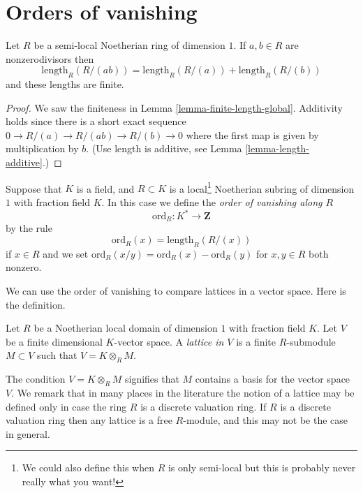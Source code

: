\section{Orders of vanishing}
\label{section-orders-of-vanishing}

\begin{lemma}
\label{lemma-ord-additive}
Let $R$ be a semi-local Noetherian ring of dimension $1$.
If $a, b \in R$ are nonzerodivisors then
$$
\text{length}_R(R/(ab)) =
\text{length}_R(R/(a)) +
\text{length}_R(R/(b))
$$
and these lengths are finite.
\end{lemma}

\begin{proof}
We saw the finiteness in Lemma \ref{lemma-finite-length-global}.
Additivity holds since there is a short exact sequence
$0 \to R/(a) \to R/(ab) \to R/(b) \to 0$ where the first map
is given by multiplication by $b$. (Use length is additive,
see Lemma \ref{lemma-length-additive}.)
\end{proof}

\begin{definition}
\label{definition-ord}
Suppose that $K$ is a field, and $R \subset K$ is a
local\footnote{We could also define this when $R$ is only
semi-local but this is probably never really what you want!}
Noetherian subring of dimension $1$ with fraction field $K$.
In this case we define the {\it order of vanishing along $R$}
$$
\text{ord}_R : K^* \longrightarrow \mathbf{Z}
$$
by the rule
$$
\text{ord}_R(x) = \text{length}_R(R/(x))
$$
if $x \in R$ and we set
$\text{ord}_R(x/y) = \text{ord}_R(x) - \text{ord}_R(y)$
for $x, y \in R$ both nonzero.
\end{definition}

\noindent
We can use the order of vanishing to compare lattices in a
vector space. Here is the definition.

\begin{definition}
\label{definition-lattice}
Let $R$ be a Noetherian local domain of dimension $1$ with
fraction field $K$. Let $V$ be a finite dimensional $K$-vector space.
A {\it lattice in $V$} is a finite $R$-submodule $M \subset V$ such
that $V = K \otimes_R M$.
\end{definition}

\noindent
The condition $V = K \otimes_R M$ signifies that $M$ contains a
basis for the vector space $V$. We remark that in many places in the
literature the notion of a lattice may be defined only in case the
ring $R$ is a discrete valuation ring. If $R$ is a discrete valuation
ring then any lattice is a free $R$-module, and this may not be the case
in general.

